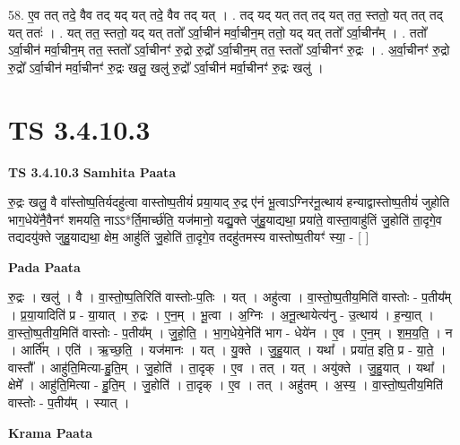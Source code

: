 \documentclass[17pt]{extarticle}
\begin{document}
58. ए॒व तत् तदे॒ वैव तद् यद् यत् तदे॒ वैव तद् यत् । . तद् यद् यत् तत् तद् यत् तत॒ स्ततो॒ यत् तत् तद् यत् ततः॑ । . यत् तत॒ स्ततो॒ यद् यत् ततो᳚ ऽर्वा॒चीन॑ मर्वा॒चीन॒म् ततो॒ यद् यत् ततो᳚ ऽर्वा॒चीन᳚म् । . ततो᳚ ऽर्वा॒चीन॑ मर्वा॒चीन॒म् तत॒ स्ततो᳚ ऽर्वा॒चीनꣳ॑ रु॒द्रो रु॒द्रो᳚ ऽर्वा॒चीन॒म् तत॒ स्ततो᳚ ऽर्वा॒चीनꣳ॑ रु॒द्रः । . अ॒र्वा॒चीनꣳ॑ रु॒द्रो रु॒द्रो᳚ ऽर्वा॒चीन॑ मर्वा॒चीनꣳ॑ रु॒द्रः खलु॒ खलु॑ रु॒द्रो᳚ ऽर्वा॒चीन॑ मर्वा॒चीनꣳ॑ रु॒द्रः खलु॑ । \newline
\pagebreak
{}

\section{ TS 3.4.10.3 }

\textbf{TS 3.4.10.3 } \newline
\textbf{Samhita Paata} \newline

रु॒द्रः खलु॒ वै वा᳚स्तोष्प॒तिर्यदहु॑त्वा वास्तोष्प॒तीयं॑ प्रया॒याद् रु॒द्र ए॑नं भू॒त्वाऽग्निर॑नू॒त्थाय॑ हन्याद्वास्तोष्प॒तीयं॑ जुहोति भाग॒धेये॑नै॒वैनꣳ॑ शमयति॒ नाऽऽ*र्ति॒मार्च्छ॑ति॒ यज॑मानो॒ यद्यु॒क्ते जु॑हु॒याद्यथा॒ प्रया॑ते॒ वास्ता॒वाहु॑तिं जु॒होति॑ ता॒दृगे॒व तद्यदयु॑क्ते जुहु॒याद्यथा॒ क्षेम॒ आहु॑तिं जु॒होति॑ ता॒दृगे॒व तदहु॑तमस्य वास्तोष्प॒तीयꣳ॑ स्या॒ - [  ] \newline

\textbf{Pada Paata} \newline

रु॒द्रः । खलु॑ । वै । वा॒स्तो॒ष्प॒तिरिति॑ वास्तोः-प॒तिः । यत् । अहु॑त्वा । वा॒स्तो॒ष्प॒तीय॒मिति॑ वास्तोः - प॒तीय᳚म् । प्र॒या॒यादिति॑ प्र - या॒यात् । रु॒द्रः । ए॒न॒म् । भू॒त्वा । अ॒ग्निः । अ॒नू॒त्थायेत्य॑नु - उ॒त्थाय॑ । ह॒न्या॒त् । वा॒स्तो॒ष्प॒तीय॒मिति॑ वास्तोः - प॒तीय᳚म् । जु॒हो॒ति॒ । भा॒ग॒धेये॒नेति॑ भाग - धेये॑न । ए॒व । ए॒न॒म् । श॒म॒य॒ति॒ । न । आर्ति᳚म् । एति॑ । ऋ॒च्छ॒ति॒ । यज॑मानः । यत् । यु॒क्ते । जु॒हु॒यात् । यथा᳚ । प्रया॑त॒ इति॒ प्र - या॒ते॒ । वास्तौ᳚ । आहु॑ति॒मित्या-हु॒ति॒म् । जु॒होति॑ । ता॒दृक् । ए॒व । तत् । यत् । अयु॑क्ते । जु॒हु॒यात् । यथा᳚ । क्षेमे᳚ । आहु॑ति॒मित्या - हु॒ति॒म् । जु॒होति॑ । ता॒दृक् । ए॒व । तत् । अहु॑तम् । अ॒स्य॒ । वा॒स्तो॒ष्प॒तीय॒मिति॑ वास्तोः - प॒तीय᳚म् । स्यात् ।  \newline


\textbf{Krama Paata} \newline
\end{document}
